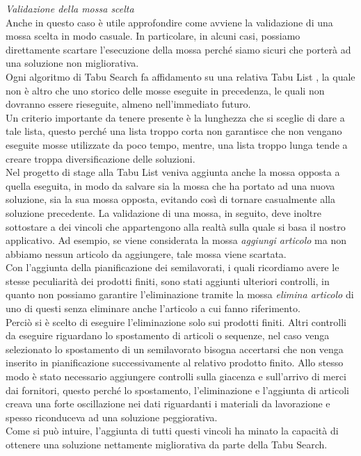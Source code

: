 \textit{Validazione della mossa scelta}\\
Anche in questo caso è utile approfondire come avviene la validazione di una mossa scelta in modo casuale. In particolare, in alcuni casi, possiamo direttamente scartare
l'esecuzione della mossa perché siamo sicuri che porterà ad una soluzione non migliorativa.\\ Ogni algoritmo di Tabu Search fa affidamento su una relativa 
Tabu List , la quale non è altro che uno storico delle mosse eseguite in precedenza, le quali non dovranno essere rieseguite, almeno nell'immediato futuro.\\
Un criterio importante da tenere presente
è la lunghezza che si sceglie di dare a tale lista, questo perché una lista troppo corta non garantisce che non vengano eseguite mosse utilizzate da poco tempo, mentre, una 
lista troppo lunga tende a creare troppa diversificazione delle soluzioni.\\ Nel progetto di stage alla Tabu List veniva aggiunta anche la mossa opposta a quella eseguita, in modo
da salvare sia la mossa che ha portato ad una nuova soluzione, sia la sua mossa opposta, evitando così di tornare casualmente alla soluzione precedente. 
La validazione di una mossa,
in seguito, deve inoltre sottostare a dei vincoli che appartengono alla realtà sulla quale si basa il nostro applicativo. Ad esempio, se viene considerata la mossa \textit{aggiungi articolo}
ma non abbiamo nessun articolo da aggiungere, tale mossa viene scartata.\\ Con l'aggiunta della pianificazione dei semilavorati, i quali ricordiamo avere le stesse peculiarità
dei prodotti finiti, sono stati aggiunti ulteriori controlli, in quanto non possiamo garantire l'eliminazione tramite la mossa \textit{elimina articolo} di uno di questi senza
eliminare anche l'articolo a cui fanno riferimento.\\ Perciò si è scelto di eseguire l'eliminazione solo sui prodotti finiti. Altri controlli da eseguire riguardano lo spostamento
di articoli o sequenze, nel caso venga selezionato lo spostamento di un semilavorato bisogna accertarsi che non venga inserito in pianificazione successivamente al relativo
prodotto finito. Allo stesso modo è stato necessario aggiungere controlli sulla giacenza e sull'arrivo di merci dai fornitori, questo perché lo spostamento, l'eliminazione e l'aggiunta
di articoli creava una forte oscillazione nei dati riguardanti i materiali da lavorazione e spesso riconduceva ad una soluzione peggiorativa.\\ Come si può intuire, l'aggiunta
di tutti questi vincoli ha minato la capacità di ottenere una soluzione nettamente migliorativa da parte della Tabu Search.\\

